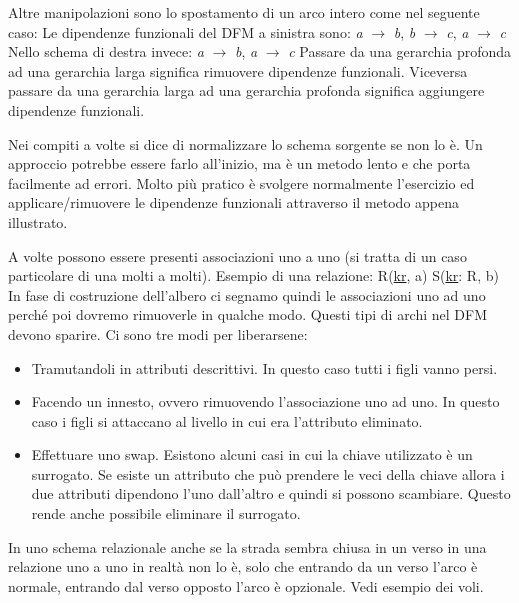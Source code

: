 Altre manipolazioni sono lo spostamento di un arco intero come nel seguente caso:
\noindent Le dipendenze funzionali del DFM a sinistra sono:\newline
\textit{a} $\xrightarrow{}$ \textit{b}, \textit{b} $\xrightarrow{}$ \textit{c}, \textit{a} $\xrightarrow{}$ \textit{c}\newline
Nello schema di destra invece:
\textit{a} $\xrightarrow{}$ \textit{b}, \textit{a} $\xrightarrow{}$ \textit{c}\newline
Passare da una gerarchia profonda ad una gerarchia larga significa rimuovere dipendenze funzionali. Viceversa passare da una gerarchia larga ad una gerarchia profonda significa aggiungere dipendenze funzionali.
\begin{warn}
	Nei compiti a volte si dice di normalizzare lo schema sorgente se non lo è. Un approccio potrebbe essere farlo all'inizio, ma è un metodo lento e che porta facilmente ad errori. Molto più pratico è svolgere normalmente l'esercizio ed applicare/rimuovere le dipendenze funzionali attraverso il metodo appena illustrato.
\end{warn}
A volte possono essere presenti associazioni uno a uno (si tratta di un caso particolare di una molti a molti). Esempio di una relazione:\newline
R(\underline{kr}, a)\newline
S(\underline{kr}: R, b)\newline
{}
\noindent In fase di costruzione dell'albero ci segnamo quindi le associazioni uno ad uno perché poi dovremo rimuoverle in qualche modo. Questi tipi di archi nel DFM devono sparire. Ci sono tre modi per liberarsene:
\begin{itemize}
	\item Tramutandoli in attributi descrittivi. In questo caso tutti i figli vanno persi.
	\item Facendo un innesto, ovvero rimuovendo l'associazione uno ad uno. In questo caso i figli si attaccano al livello in cui era l'attributo eliminato.
	\item Effettuare uno swap. Esistono alcuni casi in cui la chiave utilizzato è un surrogato. Se esiste un attributo che può prendere le veci della chiave allora i due attributi dipendono l'uno dall'altro e quindi si possono scambiare. Questo rende anche possibile eliminare il surrogato.
\end{itemize}
\begin{warn}
	In uno schema relazionale anche se la strada sembra chiusa in un verso in una relazione uno a uno in realtà non lo è, solo che entrando da un verso l'arco è normale, entrando dal verso opposto l'arco è opzionale. Vedi esempio dei voli.
\end{warn}
